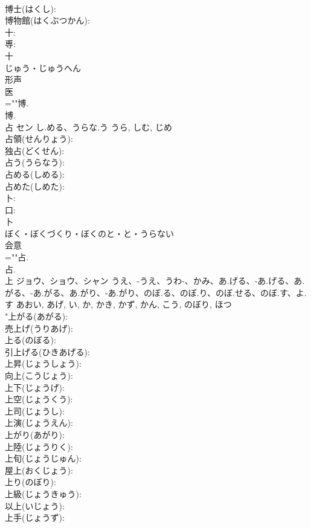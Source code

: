\documentclass[8pt]{extreport}
\begin{document}
\begin{CJK}{UTF8}{min}
\\	博士(はくし): 
\\	博物館(はくぶつかん): 
\\	十: 
\\	尃: 
\\	十	
\\	じゅう・じゅうへん	
\\	形声 
\\	医 
\\	=""博.
\\	博.
\\	占	セン	し.める、うらな.う	うら, しむ, じめ	
\\	占領(せんりょう): 
\\	独占(どくせん): 
\\	占う(うらなう): 
\\	占める(しめる): 
\\	占めた(しめた): 
\\	卜: 
\\	口: 
\\	卜	
\\	ぼく・ぼくづくり・ぼくのと・と・うらない	
\\	会意 
\\	=""占.
\\	占.
\\	上	ジョウ、ショウ、シャン	うえ、-うえ、うわ-、かみ、あ.げる、-あ.げる、あ.がる、-あ.がる、あ.がり、-あ.がり、のぼ.る、のぼ.り、のぼ.せる、のぼ.す、よ.す	あおい, あげ, い, か, かき, かず, かん, こう, のぼり, ほつ	
\\	"上がる(あがる): 
\\	売上げ(うりあげ): 
\\	上る(のぼる): 
\\	引上げる(ひきあげる): 
\\	上昇(じょうしょう): 
\\	向上(こうじょう): 
\\	上下(じょうげ): 
\\	上空(じょうくう): 
\\	上司(じょうし): 
\\	上演(じょうえん): 
\\	上がり(あがり): 
\\	上陸(じょうりく): 
\\	上旬(じょうじゅん): 
\\	屋上(おくじょう): 
\\	上り(のぼり): 
\\	上級(じょうきゅう): 
\\	以上(いじょう): 
\\	上手(じょうず): 

\end{CJK}
\end{document}

